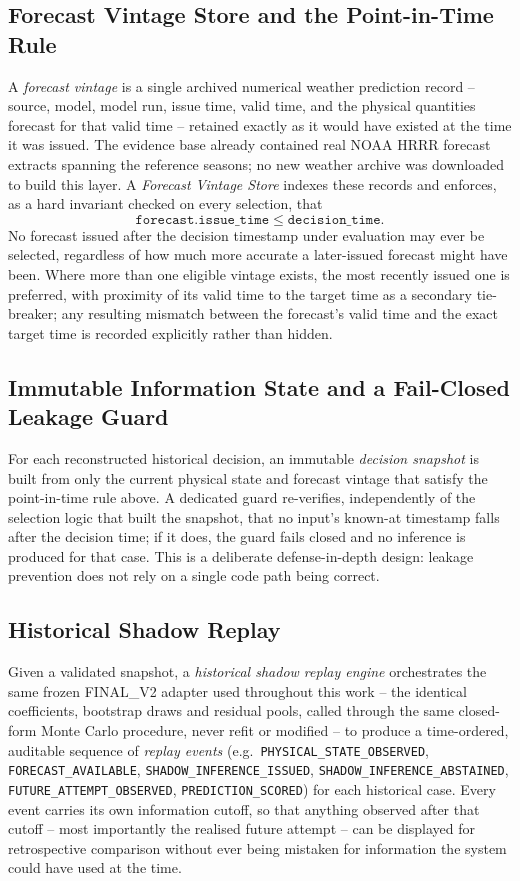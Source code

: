 \subsection{Forecast Vintage Store and the Point-in-Time Rule}
A \emph{forecast vintage} is a single archived numerical weather prediction record -- source, model, model
run, issue time, valid time, and the physical quantities forecast for that valid time -- retained exactly as
it would have existed at the time it was issued. The evidence base already contained real NOAA HRRR
forecast extracts spanning the reference seasons; no new weather archive was downloaded to build this layer.
A \emph{Forecast Vintage Store} indexes these records and enforces, as a hard invariant checked on every
selection, that
\[
\texttt{forecast.issue\_time} \le \texttt{decision\_time}.
\]
No forecast issued after the decision timestamp under evaluation may ever be selected, regardless of how much
more accurate a later-issued forecast might have been. Where more than one eligible vintage exists, the most
recently issued one is preferred, with proximity of its valid time to the target time as a secondary
tie-breaker; any resulting mismatch between the forecast's valid time and the exact target time is recorded
explicitly rather than hidden.

\subsection{Immutable Information State and a Fail-Closed Leakage Guard}
For each reconstructed historical decision, an immutable \emph{decision snapshot} is built from only the
current physical state and forecast vintage that satisfy the point-in-time rule above. A dedicated guard
re-verifies, independently of the selection logic that built the snapshot, that no input's known-at timestamp
falls after the decision time; if it does, the guard fails closed and no inference is produced for that case.
This is a deliberate defense-in-depth design: leakage prevention does not rely on a single code path being
correct.

\subsection{Historical Shadow Replay}
Given a validated snapshot, a \emph{historical shadow replay engine} orchestrates the same frozen FINAL\_V2
adapter used throughout this work -- the identical coefficients, bootstrap draws and residual pools, called
through the same closed-form Monte Carlo procedure, never refit or modified -- to produce a time-ordered,
auditable sequence of \emph{replay events} (e.g.\ \texttt{PHYSICAL\_STATE\_OBSERVED}, \texttt{FORECAST\_AVAILABLE},
\texttt{SHADOW\_INFERENCE\_ISSUED}, \texttt{SHADOW\_INFERENCE\_ABSTAINED}, \texttt{FUTURE\_ATTEMPT\_OBSERVED},
\texttt{PREDICTION\_SCORED}) for each historical case. Every event carries its own information cutoff, so
that anything observed after that cutoff -- most importantly the realised future attempt -- can be displayed
for retrospective comparison without ever being mistaken for information the system could have used at the
time.

